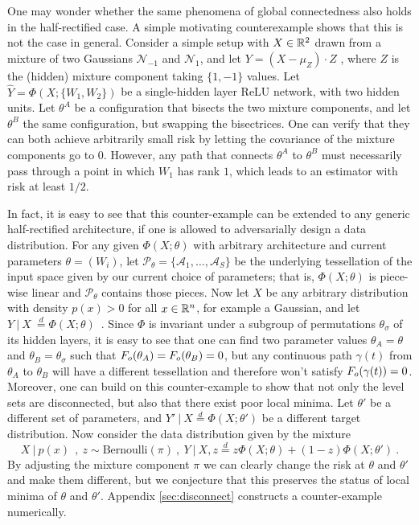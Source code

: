 One may wonder whether the same phenomena of global connectedness also holds 
in the half-rectified case. A simple motivating counterexample shows that this is not the case in 
general. Consider a simple setup with $X \in {\mathbb{R}}^2$ drawn from a mixture of two Gaussians $\mathcal{N}_{-1}$ 
and $\mathcal{N}_{1}$, and let $Y = (X-\mu_Z) \cdot Z $ , where $Z$ is the (hidden) mixture component taking $\{1,-1\}$ values.  Let 
$\hat{Y} = \Phi(X; \{ W_1, W_2\} )$ be a single-hidden layer ReLU network, with two hidden units. 
Let $\theta^A$ be a configuration that bisects the two mixture components, 
and let $\theta^B$ the same configuration, but swapping the bisectrices. 
One can verify that they can both achieve arbitrarily small risk by letting the covariance of the mixture components go to $0$. 
However, any path that connects $\theta^A$ to $\theta^B$ 
must necessarily pass through a point in which $W_1$ has rank $1$, which leads to an estimator with risk at least $1/2$.  

In fact, it is easy to see that this counter-example can be extended to any generic half-rectified architecture, if one is 
allowed to adversarially design a data distribution. For any given $\Phi(X; \theta)$ with arbitrary architecture and current parameters 
$\theta = (W_i)$, let $\mathcal{P}_\theta=\{ \mathcal{A}_1, \dots, \mathcal{A}_S\}$ be the underlying tessellation of the input space given by our current choice of parameters; that is, $\Phi(X; \theta)$ is piece-wise linear and $\mathcal{P}_\theta$ contains those pieces. Now let 
$X$ be any arbitrary distribution with density $p(x) > 0$ for all $x \in {\mathbb{R}}^n$, for example a Gaussian, and let %
$Y ~|~X ~\stackrel{d}{=} \Phi(X ; \theta)$~. Since $\Phi$ is invariant under a subgroup of permutations $\theta_\sigma$ of its hidden layers, it is easy to see that one can find two parameter values $\theta_A = \theta$ and $\theta_B = \theta_\sigma$ such that $F_{o}(\theta_A) = F_{o}(\theta_B) = 0$, but any continuous path $\gamma(t)$ from $\theta_A$ to $\theta_B$ will have a different tessellation and therefore won't satisfy $F_{o}( \gamma(t) ) = 0$. 
Moreover, one can build on this counter-example to show that not only the level sets are disconnected, but also that there exist poor local minima. Let $\theta'$ be a different set of parameters, and $Y' ~|~X \stackrel{d}{=} \Phi(X; \theta')$ be a different target distribution. Now consider the data distribution given by the mixture
$$X ~|~p(x) ~~,~z \sim \text{Bernoulli}(\pi)~,~Y ~|~X,z \stackrel{d}{=} z \Phi(X;\theta) + (1-z) \Phi(X; \theta')~.$$
By adjusting the mixture component $\pi$ we can clearly change the risk at $\theta$ and $\theta'$ and make them different, but we conjecture that this preserves the status of local minima of $\theta$ and $\theta'$. Appendix \ref{sec:disconnect} constructs a counter-example numerically.
 
